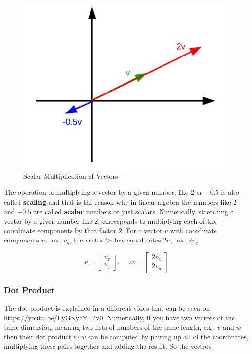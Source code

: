 \documentclass[
]{book}
\theoremstyle{definition}
\theoremstyle{definition}
\theoremstyle{definition}
\theoremstyle{remark}
\begin{document}
\begin{figure}[!ht]
\includegraphics[width=1\linewidth,]{odg/vector-scalar-multiplication} \caption{Scalar Multiplication of Vectors}\label{fig:vector-scalar-multiplication}
\end{figure}

The operation of multiplying a vector by a given number, like \(2\) or \(-0.5\) is also called \textbf{scaling} and that is the reason why in linear algebra the numbers like \(2\) and \(-0.5\) are called \textbf{scalar} numbers or just scalars. Numerically, stretching a vector by a given number like \(2\), corresponds to multiplying each of the coordinate components by that factor \(2\). For a vector \(v\) with coordinate components \(v_x\) and \(v_y\), the vector \(2v\) has coordinates \(2v_x\) and \(2v_y\)

\[v = \left[\begin{array}{c} v_x \\ v_y \end{array}\right] \text{, }\quad 2v = \left[\begin{array}{c} 2v_x \\ 2v_y \end{array}\right]\]

\hypertarget{intro-linalg-dot-product}{%
\subsubsection{Dot Product}\label{intro-linalg-dot-product}}

The dot product is explained in a different video that can be seen on \url{https://youtu.be/LyGKycYT2v0}. Numerically, if you have two vectors of the same dimension, meaning two lists of numbers of the same length, e.g.~\(v\) and \(w\) then their dot product \(v \cdot w\) can be computed by pairing up all of the coordinates, multiplying these pairs together and adding the result. So the vectors
\end{document}
